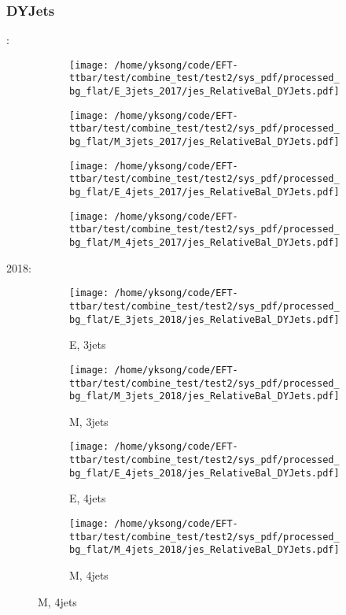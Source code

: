 \documentclass{beamer}
\begin{document}
\begin{frame}
\frametitle{DYJets}
\fontsize{5}{1}:
\begin{figure}
\centering
\begin{subfigure}[b]{0.24\textwidth}
\texttt{[image: /home/yksong/code/EFT-ttbar/test/combine\_test/test2/sys\_pdf/processed\_bg\_flat/E\_3jets\_2017/jes\_RelativeBal\_DYJets.pdf]}
\end{subfigure}
\begin{subfigure}[b]{0.24\textwidth}
\texttt{[image: /home/yksong/code/EFT-ttbar/test/combine\_test/test2/sys\_pdf/processed\_bg\_flat/M\_3jets\_2017/jes\_RelativeBal\_DYJets.pdf]}
\end{subfigure}
\begin{subfigure}[b]{0.24\textwidth}
\texttt{[image: /home/yksong/code/EFT-ttbar/test/combine\_test/test2/sys\_pdf/processed\_bg\_flat/E\_4jets\_2017/jes\_RelativeBal\_DYJets.pdf]}
\end{subfigure}
\begin{subfigure}[b]{0.24\textwidth}
\texttt{[image: /home/yksong/code/EFT-ttbar/test/combine\_test/test2/sys\_pdf/processed\_bg\_flat/M\_4jets\_2017/jes\_RelativeBal\_DYJets.pdf]}
\end{subfigure}
\end{figure}
2018:
\begin{figure}
\centering
\begin{subfigure}[b]{0.24\textwidth}
\texttt{[image: /home/yksong/code/EFT-ttbar/test/combine\_test/test2/sys\_pdf/processed\_bg\_flat/E\_3jets\_2018/jes\_RelativeBal\_DYJets.pdf]}
\captionsetup{font=tiny}
\caption{E, 3jets}
\end{subfigure}
\begin{subfigure}[b]{0.24\textwidth}
\texttt{[image: /home/yksong/code/EFT-ttbar/test/combine\_test/test2/sys\_pdf/processed\_bg\_flat/M\_3jets\_2018/jes\_RelativeBal\_DYJets.pdf]}
\captionsetup{font=tiny}
\caption{M, 3jets}
\end{subfigure}
\begin{subfigure}[b]{0.24\textwidth}
\texttt{[image: /home/yksong/code/EFT-ttbar/test/combine\_test/test2/sys\_pdf/processed\_bg\_flat/E\_4jets\_2018/jes\_RelativeBal\_DYJets.pdf]}
\captionsetup{font=tiny}
\caption{E, 4jets}
\end{subfigure}
\begin{subfigure}[b]{0.24\textwidth}
\texttt{[image: /home/yksong/code/EFT-ttbar/test/combine\_test/test2/sys\_pdf/processed\_bg\_flat/M\_4jets\_2018/jes\_RelativeBal\_DYJets.pdf]}
\captionsetup{font=tiny}
\caption{M, 4jets}
\end{subfigure}
\end{figure}
\end{frame}
\end{document}
